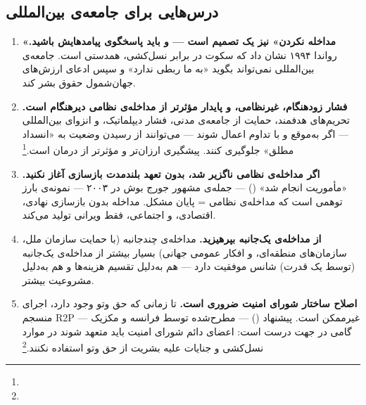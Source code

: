 \subsection{درس‌هایی برای جامعه‌ی بین‌المللی}
\label{subsec:ch15-lessons-international}

\begin{tcolorbox}[wavebox, title={پنج درس برای جامعه‌ی بین‌المللی}]
\begin{enumerate}
\item \textbf{«مداخله نکردن» نیز یک تصمیم است — و باید پاسخگوی پیامدهایش باشید.} رواندا ۱۹۹۴ نشان داد که سکوت در برابر نسل‌کشی، همدستی است. جامعه‌ی بین‌المللی نمی‌تواند بگوید «به ما ربطی ندارد» و سپس ادعای ارزش‌های جهان‌شمول حقوق بشر کند.

\item \textbf{فشار زودهنگام، غیرنظامی، و پایدار مؤثرتر از مداخله‌ی نظامی دیرهنگام است.} تحریم‌های هدفمند، حمایت از جامعه‌ی مدنی، فشار دیپلماتیک، و انزوای بین‌المللی — اگر به‌موقع و با تداوم اعمال شوند — می‌توانند از رسیدن وضعیت به «انسداد مطلق» جلوگیری کنند. پیشگیری ارزان‌تر و مؤثرتر از درمان است.\footnote{}

\item \textbf{اگر مداخله‌ی نظامی ناگزیر شد، بدون تعهد بلندمدت بازسازی آغاز نکنید.} «مأموریت انجام شد» () — جمله‌ی مشهور جورج بوش در ۲۰۰۳ — نمونه‌ی بارز توهمی است که مداخله‌ی نظامی = پایان مشکل. مداخله بدون بازسازی نهادی، اقتصادی، و اجتماعی، فقط ویرانی تولید می‌کند.

\item \textbf{از مداخله‌ی یک‌جانبه بپرهیزید.} مداخله‌ی چندجانبه (با حمایت سازمان ملل، سازمان‌های منطقه‌ای، و افکار عمومی جهانی) بسیار بیشتر از مداخله‌ی یک‌جانبه (توسط یک قدرت) شانس موفقیت دارد — هم به‌دلیل تقسیم هزینه‌ها و هم به‌دلیل مشروعیت بیشتر.

\item \textbf{اصلاح ساختار شورای امنیت ضروری است.} تا زمانی که حق وتو وجود دارد، اجرای منسجم R2P غیرممکن است. پیشنهاد  () — مطرح‌شده توسط فرانسه و مکزیک — گامی در جهت درست است: اعضای دائم شورای امنیت باید متعهد شوند در موارد نسل‌کشی و جنایات علیه بشریت از حق وتو استفاده نکنند.\footnote{}
\end{enumerate}
\end{tcolorbox}



